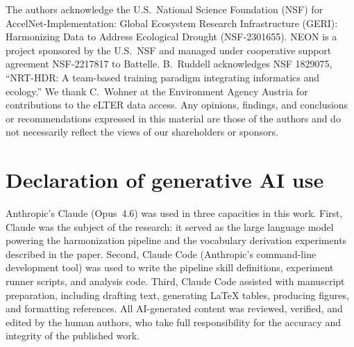 \documentclass[review,authoryear]{elsarticle}
\begin{document}
The authors acknowledge the U.S.\ National Science Foundation (NSF) for AccelNet-Implementation: Global Ecosystem Research Infrastructure (GERI): Harmonizing Data to Address Ecological Drought (NSF-2301655). NEON is a project sponsored by the U.S.\ NSF and managed under cooperative support agreement NSF-2217817 to Battelle. B.\ Ruddell acknowledges NSF 1829075, ``NRT-HDR: A team-based training paradigm integrating informatics and ecology.'' We thank C.\ Wohner at the Environment Agency Austria for contributions to the eLTER data access. Any opinions, findings, and conclusions or recommendations expressed in this material are those of the authors and do not necessarily reflect the views of our shareholders or sponsors.

\section*{Declaration of generative AI use}

Anthropic's Claude (Opus~4.6) was used in three capacities in this work. First, Claude was the subject of the research: it served as the large language model powering the harmonization pipeline and the vocabulary derivation experiments described in the paper. Second, Claude Code (Anthropic's command-line development tool) was used to write the pipeline skill definitions, experiment runner scripts, and analysis code. Third, Claude Code assisted with manuscript preparation, including drafting text, generating LaTeX tables, producing figures, and formatting references. All AI-generated content was reviewed, verified, and edited by the human authors, who take full responsibility for the accuracy and integrity of the published work.



\end{document}
